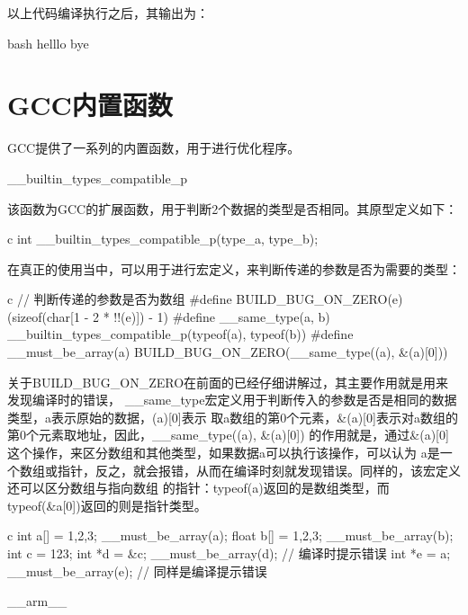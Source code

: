 以上代码编译执行之后，其输出为：
\begin{code-block}{bash}
helllo
bye
\end{code-block}

\section{GCC内置函数}
GCC提供了一系列的内置函数，用于进行优化程序。

\begin{outline}[enumerate]

\1 \_\_builtin\_types\_compatible\_p

该函数为GCC的扩展函数，用于判断2个数据的类型是否相同。其原型定义如下：
\begin{code-block}{c}
  int __builtin_types_compatible_p(type_a, type_b);
\end{code-block}

在真正的使用当中，可以用于进行宏定义，来判断传递的参数是否为需要的类型：
\begin{code-block}{c}
// 判断传递的参数是否为数组
#define BUILD_BUG_ON_ZERO(e) (sizeof(char[1 - 2 * !!(e)]) - 1)
#define __same_type(a, b) __builtin_types_compatible_p(typeof(a), typeof(b))
#define __must_be_array(a) BUILD_BUG_ON_ZERO(__same_type((a), &(a)[0]))
\end{code-block}

关于BUILD\_BUG\_ON\_ZERO在前面的已经仔细讲解过，其主要作用就是用来发现编译时的错误，
\_\_same\_type宏定义用于判断传入的参数是否是相同的数据类型，a表示原始的数据，(a)[0]表示
取a数组的第0个元素，\&(a)[0]表示对a数组的第0个元素取地址，因此，\_\_same\_type((a), \&(a)[0])
的作用就是，通过\&(a)[0]这个操作，来区分数组和其他类型，如果数据a可以执行该操作，可以认为
a是一个数组或指针，反之，就会报错，从而在编译时刻就发现错误。同样的，该宏定义还可以区分数组与指向数组
的指针：typeof(a)返回的是数组类型，而typeof(\&a[0])返回的则是指针类型。

\begin{code-block}{c}
int a[] = {1,2,3};
__must_be_array(a);
float b[] = {1,2,3};
__must_be_array(b);
int c = 123;
int *d = &c;
__must_be_array(d); // 编译时提示错误
int *e = a;
__must_be_array(e); // 同样是编译提示错误
\end{code-block}

\1 \_\_arm\_\_


\end{outline}
